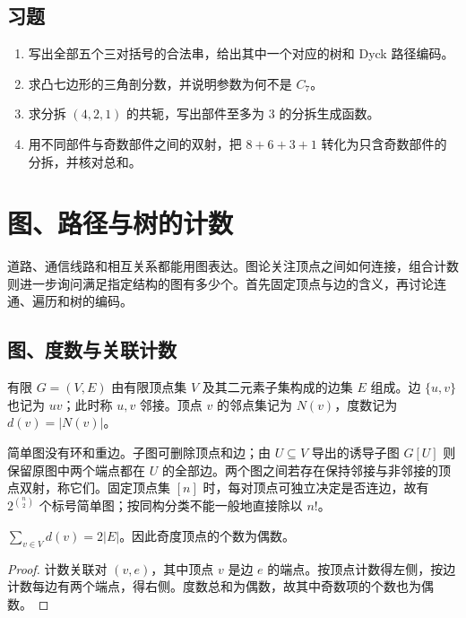 \documentclass[UTF8,12pt,a4paper,fontset=fandol]{ctexbook}
\begin{document}
\section{习题}
\begin{enumerate}
  \item\label{ex:classical-structures-1} 写出全部五个三对括号的合法串，给出其中一个对应的树和 Dyck 路径编码。
  \item\label{ex:classical-structures-2} 求凸七边形的三角剖分数，并说明参数为何不是 $C_7$。
  \item\label{ex:classical-structures-3} 求分拆 $(4,2,1)$ 的共轭，写出部件至多为 $3$ 的分拆生成函数。
  \item\label{ex:classical-structures-4} 用不同部件与奇数部件之间的双射，把 $8+6+3+1$ 转化为只含奇数部件的分拆，并核对总和。
\end{enumerate}

\chapter{图、路径与树的计数}
\label{ch:graphs-trees}

道路、通信线路和相互关系都能用图表达。图论关注顶点之间如何连接，组合计数则进一步询问满足指定结构的图有多少个。首先固定顶点与边的含义，再讨论连通、遍历和树的编码。

\section{图、度数与关联计数}

\begin{definition}
有限 $G=(V,E)$ 由有限顶点集 $V$ 及其二元素子集构成的边集 $E$ 组成。边 $\{u,v\}$ 也记为 $uv$；此时称 $u,v$ 邻接。顶点 $v$ 的邻点集记为 $N(v)$，度数记为 $d(v)=|N(v)|$。
\end{definition}

简单图没有环和重边。子图可删除顶点和边；由 $U\subseteq V$ 导出的诱导子图 $G[U]$ 则保留原图中两个端点都在 $U$ 的全部边。两个图之间若存在保持邻接与非邻接的顶点双射，称它们。固定顶点集 $[n]$ 时，每对顶点可独立决定是否连边，故有 $2^{\binom n2}$ 个标号简单图；按同构分类不能一般地直接除以 $n!$。

\begin{theorem}[握手定理]
$\sum_{v\in V}d(v)=2|E|$。因此奇度顶点的个数为偶数。
\end{theorem}
\begin{proof}
计数关联对 $(v,e)$，其中顶点 $v$ 是边 $e$ 的端点。按顶点计数得左侧，按边计数每边有两个端点，得右侧。度数总和为偶数，故其中奇数项的个数也为偶数。
\end{proof}
\end{document}
